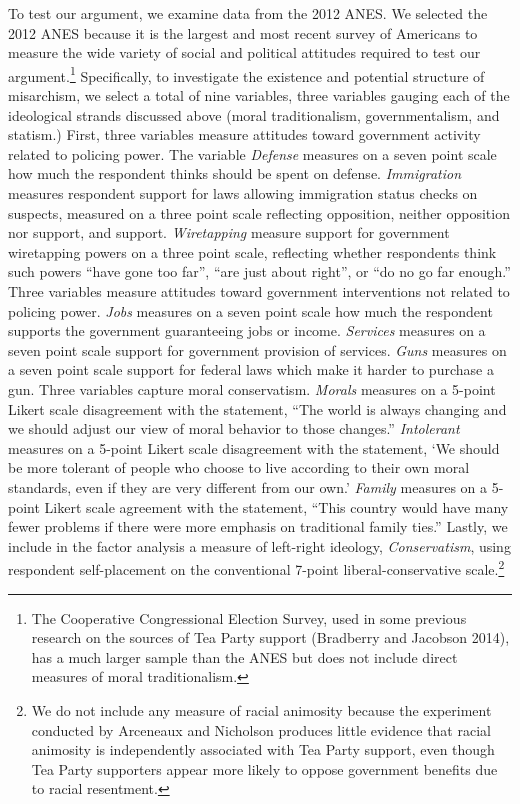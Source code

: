 \documentclass[12pt,]{article}
\let\rmarkdownfootnote\footnote%
\def\footnote{\protect\rmarkdownfootnote}
\begin{document}
To test our argument, we examine data from the 2012 ANES. We selected
the 2012 ANES because it is the largest and most recent survey of
Americans to measure the wide variety of social and political attitudes
required to test our argument.\footnote{The Cooperative Congressional
  Election Survey, used in some previous research on the sources of Tea
  Party support (Bradberry and Jacobson 2014), has a much larger sample
  than the ANES but does not include direct measures of moral
  traditionalism.} Specifically, to investigate the existence and
potential structure of misarchism, we select a total of nine variables,
three variables gauging each of the ideological strands discussed above
(moral traditionalism, governmentalism, and statism.) First, three
variables measure attitudes toward government activity related to
policing power. The variable \emph{Defense} measures on a seven point
scale how much the respondent thinks should be spent on defense.
\emph{Immigration} measures respondent support for laws allowing
immigration status checks on suspects, measured on a three point scale
reflecting opposition, neither opposition nor support, and support.
\emph{Wiretapping} measure support for government wiretapping powers on
a three point scale, reflecting whether respondents think such powers
``have gone too far'', ``are just about right'', or ``do no go far
enough.'' Three variables measure attitudes toward government
interventions not related to policing power. \emph{Jobs} measures on a
seven point scale how much the respondent supports the government
guaranteeing jobs or income. \emph{Services} measures on a seven point
scale support for government provision of services. \emph{Guns} measures
on a seven point scale support for federal laws which make it harder to
purchase a gun. Three variables capture moral conservatism.
\emph{Morals} measures on a 5-point Likert scale disagreement with the
statement, ``The world is always changing and we should adjust our view
of moral behavior to those changes.'' \emph{Intolerant} measures on a
5-point Likert scale disagreement with the statement, `We should be more
tolerant of people who choose to live according to their own moral
standards, even if they are very different from our own.' \emph{Family}
measures on a 5-point Likert scale agreement with the statement, ``This
country would have many fewer problems if there were more emphasis on
traditional family ties.'' Lastly, we include in the factor analysis a
measure of left-right ideology, \emph{Conservatism}, using respondent
self-placement on the conventional 7-point liberal-conservative
scale.\footnote{We do not include any measure of racial animosity
  because the experiment conducted by Arceneaux and Nicholson produces
  little evidence that racial animosity is independently associated with
  Tea Party support, even though Tea Party supporters appear more likely
  to oppose government benefits due to racial resentment.}
\end{document}
